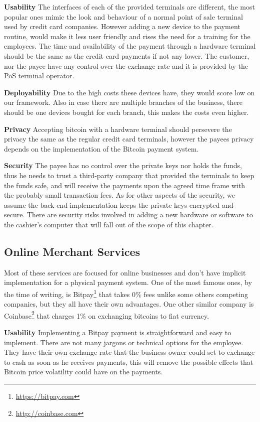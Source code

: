 \textbf{Usability}
The interfaces of each of the provided terminals are different, the most popular ones mimic the look and behaviour of a normal point of sale terminal used by credit card companies. However adding a new device to the payment routine, would make it less user friendly and rises the need for a training for the employees. The time and availability of the payment through a hardware terminal should be the same as the credit card payments if not any lower. The customer, nor the payee have any control over the exchange rate and it is provided by the PoS terminal operator.

\textbf{Deployability}
Due to the high costs these devices have, they would score low on our framework. Also in case there are multiple branches of the business, there should be one devices bought for each branch, this makes the costs even higher.

\textbf{Privacy}
Accepting bitcoin with a hardware terminal should persevere the privacy the same as the regular credit card terminals, however the payees privacy depends on the implementation of the Bitcoin payment system. 

\textbf{Security}
The payee has no control over the private keys nor holds the funds, thus he needs to trust a third-party company that provided the terminals to keep the funds safe, and will receive the payments upon the agreed time frame with the probably small transaction fees. As for other aspects of the security, we assume the back-end implementation keeps the private keys encrypted and secure. There are security risks involved in adding a new hardware or software to the cashier's computer that will fall out of the scope of this chapter.

\subsection{Online Merchant Services}
Most of these services are focused for online businesses and don't have implicit implementation for a physical payment system. 
One of the most famous ones, by the time of writing, is Bitpay\footnote{\url{https://bitpay.com}} that takes 0\% fees unlike some others competing companies, but they all have their own advantages. One other similar company is Coinbase\footnote{\url{http://coinbase.com}} that charges 1\% on exchanging bitcoins to fiat currency.

 \textbf{Usability}
Implementing a Bitpay payment is straightforward and easy to implement. There are not many jargons or technical options for the employee. They have their own exchange rate that the business owner could set to exchange to cash as soon as he receives payments, this will remove the possible effects that Bitcoin price volatility could have on the payments.

